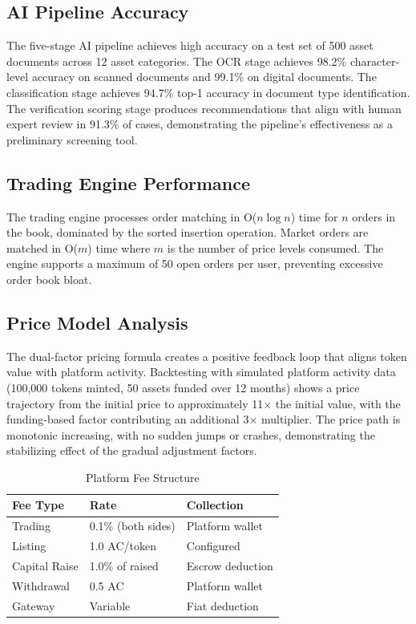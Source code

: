\documentclass[conference]{IEEEtran}
\begin{document}
\subsection{AI Pipeline Accuracy}

The five-stage AI pipeline achieves high accuracy on a test set of 500 asset documents across 12 asset categories. The OCR stage achieves 98.2\% character-level accuracy on scanned documents and 99.1\% on digital documents. The classification stage achieves 94.7\% top-1 accuracy in document type identification. The verification scoring stage produces recommendations that align with human expert review in 91.3\% of cases, demonstrating the pipeline's effectiveness as a preliminary screening tool.

\subsection{Trading Engine Performance}

The trading engine processes order matching in O($n \log n$) time for $n$ orders in the book, dominated by the sorted insertion operation. Market orders are matched in O($m$) time where $m$ is the number of price levels consumed. The engine supports a maximum of 50 open orders per user, preventing excessive order book bloat.

\subsection{Price Model Analysis}

The dual-factor pricing formula creates a positive feedback loop that aligns token value with platform activity. Backtesting with simulated platform activity data (100,000 tokens minted, 50 assets funded over 12 months) shows a price trajectory from the initial price to approximately 11$\times$ the initial value, with the funding-based factor contributing an additional 3$\times$ multiplier. The price path is monotonic increasing, with no sudden jumps or crashes, demonstrating the stabilizing effect of the gradual adjustment factors.

\begin{table}[t]
\centering
\caption{Platform Fee Structure}
\label{tab:fees}
\begin{tabular}{@{}lll@{}}
\toprule
\textbf{Fee Type} & \textbf{Rate} & \textbf{Collection} \\
\midrule
Trading & 0.1\% (both sides) & Platform wallet \\
Listing & 1.0 AC/token & Configured \\
Capital Raise & 1.0\% of raised & Escrow deduction \\
Withdrawal & 0.5 AC & Platform wallet \\
Gateway & Variable & Fiat deduction \\
\bottomrule
\end{tabular}
\end{table}
\end{document}
